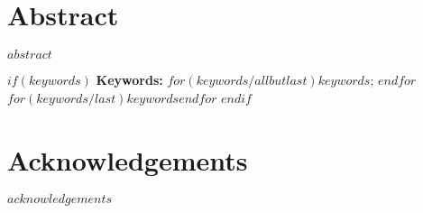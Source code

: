 

\pagestyle{empty}
\cleardoublepage

\pagestyle{plain}				%
\declaration
\cleardoublepage

\chapter*{Abstract}
\label{sec:abstract}
\vspace*{-10mm}

$abstract$

$if(keywords)$
\textbf{Keywords: } $for(keywords/allbutlast)$$keywords$; $endfor$$for(keywords/last)$$keywords$$endfor$
$endif$
\cleardoublepage

\chapter*{Acknowledgements}
\label{sec:acknowledgements}
\vspace*{-10mm}

$acknowledgements$
\cleardoublepage

\setcounter{tocdepth}{2}		%
\tableofcontents				%
\cleardoublepage

\listoffigures
\cleardoublepage

\listoftables
\cleardoublepage

\setcounter{page}{1}			%
\pagestyle{maincontentstyle} 	%
